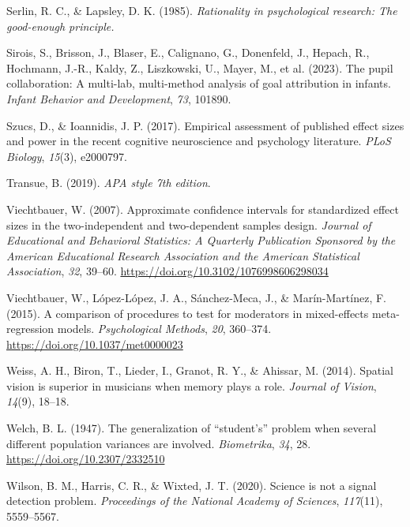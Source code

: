 \documentclass[
  man,floatsintext]{apa7}
\newlength{\cslhangindent}
\newenvironment{CSLReferences}[2] %
 {\begin{list}{}{%
  \setlength{\itemindent}{0pt}
  \setlength{\leftmargin}{0pt}
  \setlength{\parsep}{0pt}
  \ifodd #1
   \setlength{\leftmargin}{\cslhangindent}
   \setlength{\itemindent}{-1\cslhangindent}
  \fi
  \setlength{\itemsep}{#2\baselineskip}}}
 {\end{list}}
\begin{document}
\begin{CSLReferences}{1}{0}
Serlin, R. C., \& Lapsley, D. K. (1985). \emph{Rationality in psychological research: The good-enough principle.}

Sirois, S., Brisson, J., Blaser, E., Calignano, G., Donenfeld, J., Hepach, R., Hochmann, J.-R., Kaldy, Z., Liszkowski, U., Mayer, M., et al. (2023). The pupil collaboration: A multi-lab, multi-method analysis of goal attribution in infants. \emph{Infant Behavior and Development}, \emph{73}, 101890.

Szucs, D., \& Ioannidis, J. P. (2017). Empirical assessment of published effect sizes and power in the recent cognitive neuroscience and psychology literature. \emph{PLoS Biology}, \emph{15}(3), e2000797.

Transue, B. (2019). \emph{APA style 7th edition}.

Viechtbauer, W. (2007). Approximate confidence intervals for standardized effect sizes in the two-independent and two-dependent samples design. \emph{Journal of Educational and Behavioral Statistics: A Quarterly Publication Sponsored by the American Educational Research Association and the American Statistical Association}, \emph{32}, 39--60. \url{https://doi.org/10.3102/1076998606298034}

Viechtbauer, W., López-López, J. A., Sánchez-Meca, J., \& Marín-Martínez, F. (2015). A comparison of procedures to test for moderators in mixed-effects meta-regression models. \emph{Psychological Methods}, \emph{20}, 360--374. \url{https://doi.org/10.1037/met0000023}

Weiss, A. H., Biron, T., Lieder, I., Granot, R. Y., \& Ahissar, M. (2014). Spatial vision is superior in musicians when memory plays a role. \emph{Journal of Vision}, \emph{14}(9), 18--18.

Welch, B. L. (1947). The generalization of {``student's''} problem when several different population variances are involved. \emph{Biometrika}, \emph{34}, 28. \url{https://doi.org/10.2307/2332510}

Wilson, B. M., Harris, C. R., \& Wixted, J. T. (2020). Science is not a signal detection problem. \emph{Proceedings of the National Academy of Sciences}, \emph{117}(11), 5559--5567.

\end{CSLReferences}
\end{document}
